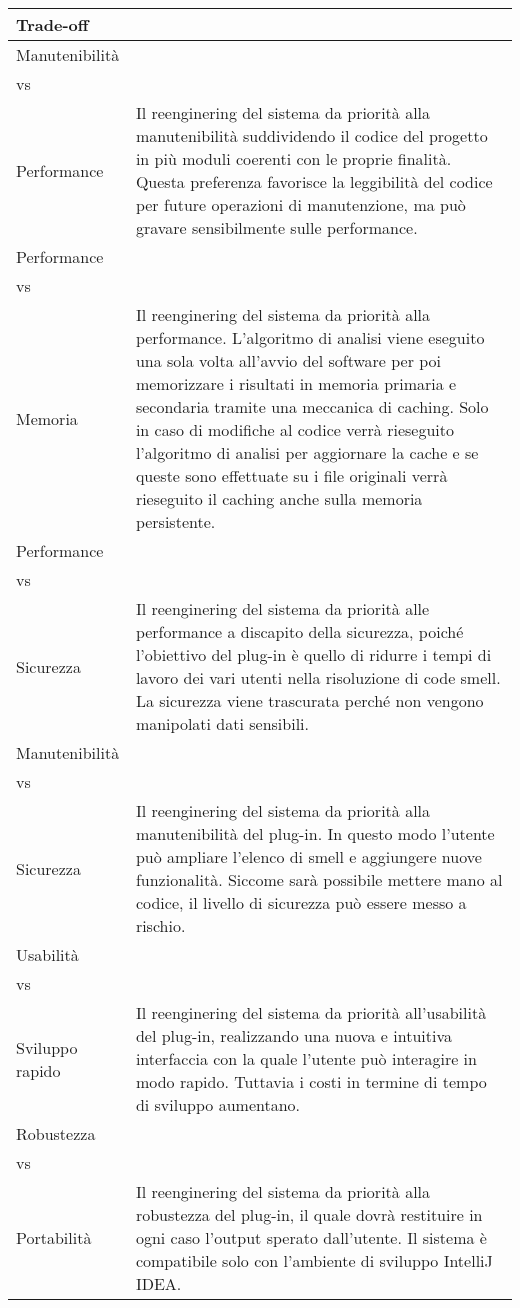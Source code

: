 		\begin{tabular}{|p{3cm}|p{13cm}|}
			\hline
			
			\textbf{Trade-off} & \\
			\hline
			
			\vfill \centering Manutenibilità \\ vs \\ Performance \vfill  & \vfill Il reenginering del sistema da priorità alla manutenibilità suddividendo il codice del progetto in più moduli coerenti con le proprie finalità. Questa preferenza favorisce la leggibilità del codice per future operazioni di manutenzione, ma può gravare sensibilmente sulle performance. \vfill \\
			\hline
			\vfill \centering Performance \\ vs \\ Memoria \vfill  & \vfill Il reenginering del sistema da priorità alla performance. L'algoritmo di analisi viene eseguito una sola volta all'avvio del software per poi memorizzare i risultati in memoria primaria e secondaria tramite una meccanica di caching. Solo in caso di modifiche al codice verrà rieseguito l'algoritmo di analisi per aggiornare la cache e se queste sono effettuate su i file originali verrà rieseguito il caching anche sulla memoria persistente.  \vfill \\
			\hline
			\vfill \centering Performance \\ vs \\ Sicurezza \vfill  & \vfill Il reenginering del sistema da priorità alle performance a discapito della sicurezza, poiché l'obiettivo del plug-in è quello di ridurre i tempi di lavoro dei vari utenti nella risoluzione di code smell. La sicurezza viene trascurata perché non vengono manipolati dati sensibili. \vfill \\
			\hline
			\vfill \centering Manutenibilità \\ vs \\ Sicurezza \vfill & \vfill Il reenginering del sistema da priorità alla manutenibilità del plug-in. In questo modo l'utente può ampliare l'elenco di smell e aggiungere nuove funzionalità. Siccome sarà possibile mettere mano al codice, il livello di sicurezza può essere messo a rischio. \vfill \\
			\hline
			\vfill \centering Usabilità \\ vs \\ Sviluppo rapido \vfill & \vfill Il reenginering del sistema da priorità all'usabilità del plug-in, realizzando una nuova e intuitiva interfaccia con la quale l'utente può interagire in modo rapido. Tuttavia i costi in termine di tempo di sviluppo aumentano. \vfill \\
			\hline
			\vfill \centering Robustezza \\ vs \\ Portabilità \vfill & \vfill Il reenginering del sistema da priorità alla robustezza del plug-in, il quale dovrà restituire in ogni caso l'output sperato dall'utente. Il sistema è compatibile solo con l'ambiente di sviluppo IntelliJ IDEA.\vfill \\
			\hline
			
		\end{tabular}